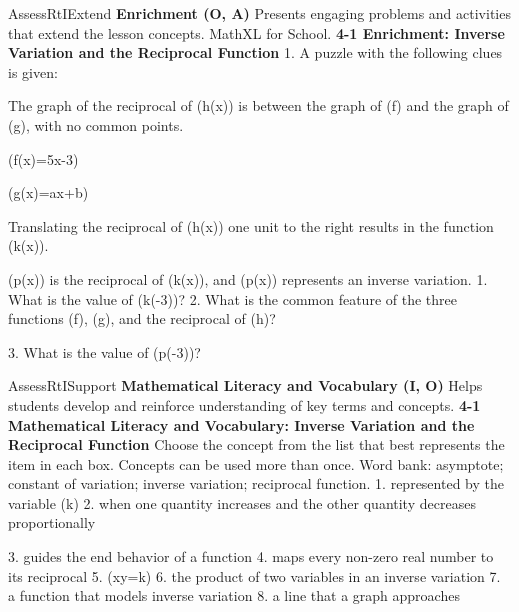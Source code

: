 \documentclass{article}
\newenvironment{te-addendum}[2]{}{}     %
\newcommand{\answer}[1]{}               %
\newcommand{\te}[1]{}                   %
\begin{document}
\begin{te-addendum}{Assess}{RtIExtend}
\textbf{Enrichment (O, A)} Presents engaging problems and activities that extend the lesson concepts. MathXL for School.
\textbf{4-1 Enrichment: Inverse Variation and the Reciprocal Function}
1. A puzzle with the following clues is given:
\item The graph of the reciprocal of (h(x)) is between the graph of (f) and the graph of (g), with no common points.
\item (f(x)=5x-3)
\item (g(x)=ax+b)
\item Translating the reciprocal of (h(x)) one unit to the right results in the function (k(x)).
\item (p(x)) is the reciprocal of (k(x)), and (p(x)) represents an inverse variation.
1. What is the value of (k(-3))? \answer{-15}
2. What is the common feature of the three functions (f), (g), and the reciprocal of (h)?
\answer{They have the same slope.}
3. What is the value of (p(-3))? \answer{(-\frac{1}{15})}
\te{Printed worksheet numbers the introductory puzzle 1 and then restarts its questions at 1.}
\end{te-addendum}
\begin{te-addendum}{Assess}{RtISupport}
\textbf{Mathematical Literacy and Vocabulary (I, O)} Helps students develop and reinforce understanding of key terms and concepts.
\textbf{4-1 Mathematical Literacy and Vocabulary: Inverse Variation and the Reciprocal Function}
Choose the concept from the list that best represents the item in each box. Concepts can be used more than once.
Word bank: asymptote; constant of variation; inverse variation; reciprocal function.
1. represented by the variable (k) \answer{constant of variation}
2. when one quantity increases and the other quantity decreases proportionally \answer{inverse relationship}
\te{Printed answer inverse relationship is not the word-bank term inverse variation.}
3. guides the end behavior of a function \answer{asymptote}
4. maps every non-zero real number to its reciprocal \answer{reciprocal function}
5. (xy=k) \answer{inverse variation}
6. the product of two variables in an inverse variation \answer{constant of variation}
7. a function that models inverse variation \answer{reciprocal function}
8. a line that a graph approaches \answer{asymptote}
\end{te-addendum}
\end{document}
